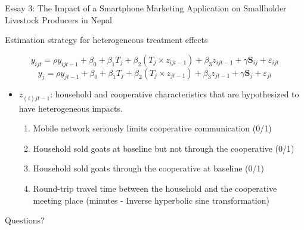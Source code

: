 \documentclass[aspectratio=169]{beamer}
\newenvironment{wideitemize}{\itemize\addtolength{\itemsep}{10pt}}{\enditemize}
\begin{document}
\begin{frame}{Essay 3: The Impact of a Smartphone Marketing Application on Smallholder Livestock Producers in Nepal}

\begin{wideitemize}
    \item Estimation strategy for heterogeneous treatment effects

\begin{equation} \label{eq:HTE1}
y_{ijt} = \rho y_{ijt-1} + \beta_{0} + \beta_{1} T_{j} + \beta_{2} (T_{j} \times z_{ijt-1}) + \beta_3 z_{ijt-1} + \gamma \textbf{S}_{ij} + \varepsilon_{ijt}
\end{equation}
\begin{equation} \label{eq:HTE2}
y_{j} = \rho y_{jt-1} + \beta_{0} + \beta_{1} T_{j} + \beta_{2} (T_{j} \times z_{jt-1}) + \beta_3 z_{jt-1} + \gamma \textbf{S}_{j} + \varepsilon_{jt}
\end{equation}

    \vspace{.25cm}
    \begin{itemize}
        \item $z_{(i)jt-1}$: household and cooperative characteristics that are hypothesized to have heterogeneous impacts. \vspace{.25cm}
            \begin{enumerate}
                \item Mobile network seriously limits cooperative communication (0/1)
                \item Household sold goats at baseline but not through the cooperative (0/1)
                \item Household sold goats through the cooperative at baseline (0/1)
                \item Round-trip travel time between the household and the cooperative meeting place (minutes - Inverse hyperbolic sine transformation)
            \end{enumerate}
    \end{itemize}
\end{wideitemize}

\end{frame}



\begin{frame}
\Huge{\centerline{Questions?}}
\end{frame}
\end{document}
